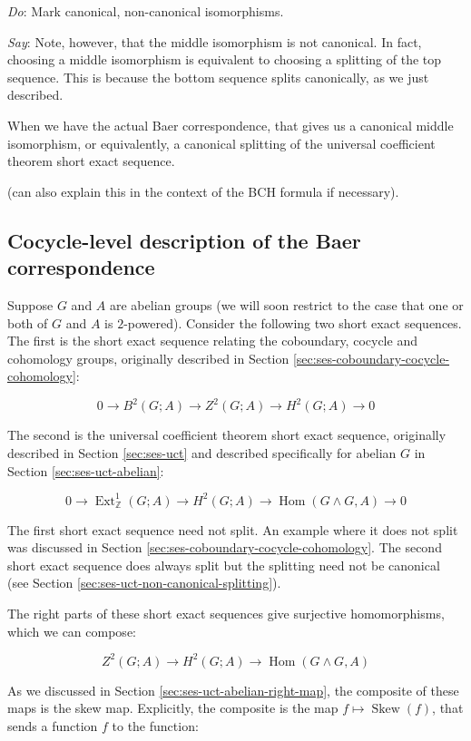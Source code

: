 \documentclass[10pt]{amsart}
\begin{document}
{\em Do}: Mark canonical, non-canonical isomorphisms.

{\em Say}: Note, however, that the middle isomorphism is not
canonical. In fact, choosing a middle isomorphism is equivalent to
choosing a splitting of the top sequence. This is because the bottom
sequence splits canonically, as we just described.

When we have the actual Baer correspondence, that gives us a canonical
middle isomorphism, or equivalently, a canonical splitting of the
universal coefficient theorem short exact sequence.

(can also explain this in the context of the BCH formula if necessary).

\subsection{Cocycle-level description of the Baer correspondence}\label{sec:baer-correspondence-cocycle-level}

Suppose $G$ and $A$ are abelian groups (we will soon restrict to the
case that one or both of $G$ and $A$ is $2$-powered). Consider the
following two short exact sequences. The first is the short exact
sequence relating the coboundary, cocycle and cohomology groups,
originally described in Section
\ref{sec:ses-coboundary-cocycle-cohomology}:

$$0 \to B^2(G;A) \to Z^2(G;A) \to H^2(G;A) \to 0$$

The second is the universal coefficient theorem short exact sequence,
originally described in Section \ref{sec:ses-uct} and described
specifically for abelian $G$ in Section \ref{sec:ses-uct-abelian}:

$$0 \to \operatorname{Ext}^1_{\mathbb{Z}}(G;A) \to H^2(G;A) \to \operatorname{Hom}(G \wedge G,A) \to 0$$

The first short exact sequence need not split. An example where it
does not split was discussed in Section
\ref{sec:ses-coboundary-cocycle-cohomology}. The second short exact
sequence does always split but the splitting need not be canonical (see
Section \ref{sec:ses-uct-non-canonical-splitting}).

The right parts of these short exact sequences give surjective
homomorphisms, which we can compose:

$$Z^2(G;A) \to H^2(G;A) \to \operatorname{Hom}(G \wedge G,A)$$

As we discussed in Section \ref{sec:ses-uct-abelian-right-map}, the
composite of these maps is the skew map. Explicitly, the composite is
the map $f \mapsto \operatorname{Skew}(f)$, that sends a function $f$
to the function:
\end{document}
